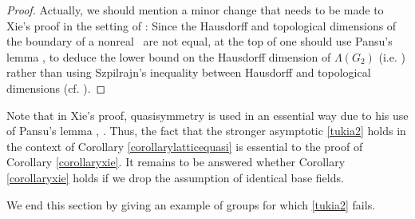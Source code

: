 {\begin{proof}
Actually, we should mention a minor change that needs to be made to Xie's proof in the setting of \ROSSs: Since the Hausdorff and topological dimensions of the boundary of a nonreal \ROSS\ are not equal,   at the top of \cite[p.252]{Xie} one should use Pansu's lemma \cite[Proposition 6.5]{Pansu1}, \cite[Lemma 2.3(a)]{Xie} to deduce the lower bound on the Hausdorff dimension of $\Lambda(G_2)$ (i.e. \cite[p.252, line 4]{Xie}) rather than using Szpilrajn's inequality between Hausdorff and topological dimensions (cf. \cite[p.252, lines 2-3]{Xie}).
\end{proof}

Note that in Xie's proof, quasisymmetry is used in an essential way due to his use of Pansu's lemma \cite[Corollary 7.2]{Pansu1}, \cite[Lemma 2.3]{Xie}. Thus, the fact that the stronger asymptotic \eqref{tukia2} holds in the context of Corollary \ref{corollarylatticequasi} is essential to the proof of Corollary \ref{corollaryxie}. It remains to be answered whether Corollary \ref{corollaryxie} holds if we drop the assumption of identical base fields.

We end this section by giving an example of groups for which \eqref{tukia2} fails.

}
